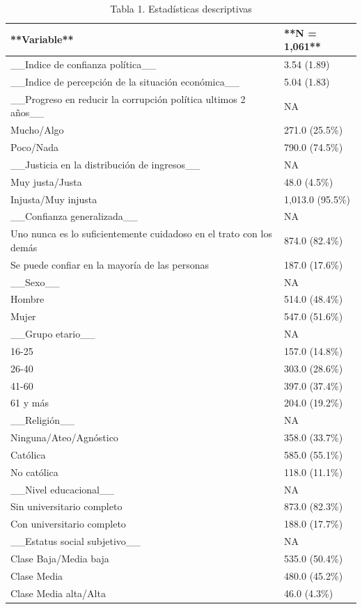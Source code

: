 \documentclass[12pt,twoside]{templates/facsothesis}
\begin{document}
\begin{table}

\caption{\label{tab:tabla-1}Tabla 1. Estadísticas descriptivas}
\centering
\begin{tabular}[t]{l|l}
\hline
**Variable** & **N = 1,061**\\
\hline
\_\_Indice de confianza política\_\_ & 3.54 (1.89)\\
\hline
\_\_Indice de percepción de la situación económica\_\_ & 5.04 (1.83)\\
\hline
\_\_Progreso en reducir la corrupción política ultimos 2 años\_\_ & NA\\
\hline
Mucho/Algo & 271.0 (25.5\%)\\
\hline
Poco/Nada & 790.0 (74.5\%)\\
\hline
\_\_Justicia en la distribución de ingresos\_\_ & NA\\
\hline
Muy justa/Justa & 48.0 (4.5\%)\\
\hline
Injusta/Muy injusta & 1,013.0 (95.5\%)\\
\hline
\_\_Confianza generalizada\_\_ & NA\\
\hline
Uno nunca es lo suficientemente cuidadoso en el trato con los demás & 874.0 (82.4\%)\\
\hline
Se puede confiar en la mayoría de las personas & 187.0 (17.6\%)\\
\hline
\_\_Sexo\_\_ & NA\\
\hline
Hombre & 514.0 (48.4\%)\\
\hline
Mujer & 547.0 (51.6\%)\\
\hline
\_\_Grupo etario\_\_ & NA\\
\hline
16-25 & 157.0 (14.8\%)\\
\hline
26-40 & 303.0 (28.6\%)\\
\hline
41-60 & 397.0 (37.4\%)\\
\hline
61 y más & 204.0 (19.2\%)\\
\hline
\_\_Religión\_\_ & NA\\
\hline
Ninguna/Ateo/Agnóstico & 358.0 (33.7\%)\\
\hline
Católica & 585.0 (55.1\%)\\
\hline
No católica & 118.0 (11.1\%)\\
\hline
\_\_Nivel educacional\_\_ & NA\\
\hline
Sin universitario completo & 873.0 (82.3\%)\\
\hline
Con universitario completo & 188.0 (17.7\%)\\
\hline
\_\_Estatus social subjetivo\_\_ & NA\\
\hline
Clase Baja/Media baja & 535.0 (50.4\%)\\
\hline
Clase Media & 480.0 (45.2\%)\\
\hline
Clase Media alta/Alta & 46.0 (4.3\%)\\
\hline
\end{tabular}
\end{table}
\end{document}
